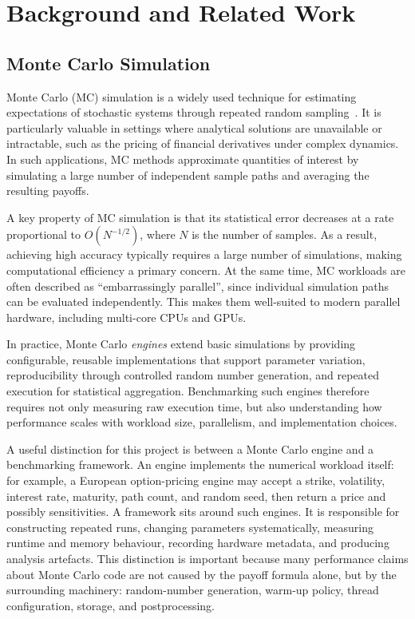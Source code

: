 \chapter{Background and Related Work}

\section{Monte Carlo Simulation}

Monte Carlo (MC) simulation is a widely used technique for estimating expectations of stochastic systems through repeated random sampling~\cite{glasserman2004}. It is particularly valuable in settings where analytical solutions are unavailable or intractable, such as the pricing of financial derivatives under complex dynamics. In such applications, MC methods approximate quantities of interest by simulating a large number of independent sample paths and averaging the resulting payoffs.

A key property of MC simulation is that its statistical error decreases at a rate proportional to $O(N^{-1/2})$, where $N$ is the number of samples. As a result, achieving high accuracy typically requires a large number of simulations, making computational efficiency a primary concern. At the same time, MC workloads are often described as ``embarrassingly parallel'', since individual simulation paths can be evaluated independently. This makes them well-suited to modern parallel hardware, including multi-core CPUs and GPUs.

In practice, Monte Carlo \emph{engines} extend basic simulations by providing configurable, reusable implementations that support parameter variation, reproducibility through controlled random number generation, and repeated execution for statistical aggregation. Benchmarking such engines therefore requires not only measuring raw execution time, but also understanding how performance scales with workload size, parallelism, and implementation choices.

A useful distinction for this project is between a Monte Carlo engine and a
benchmarking framework. An engine implements the numerical workload itself: for
example, a European option-pricing engine may accept a strike, volatility,
interest rate, maturity, path count, and random seed, then return a price and
possibly sensitivities. A framework sits around such engines. It is responsible
for constructing repeated runs, changing parameters systematically, measuring
runtime and memory behaviour, recording hardware metadata, and producing
analysis artefacts. This distinction is important because many performance
claims about Monte Carlo code are not caused by the payoff formula alone, but
by the surrounding machinery: random-number generation, warm-up policy, thread
configuration, storage, and postprocessing.

